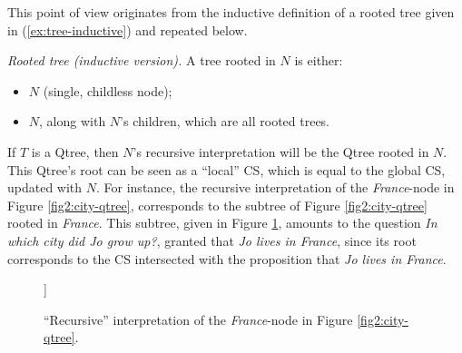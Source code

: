 This point of view originates from the inductive definition of a rooted tree given in (\ref{ex:tree-inductive}) and repeated below.

\begin{exe}
	 {\textit{Rooted tree (inductive version).} A tree rooted in $N$ is either:
		\begin{itemize}
			\item $N$ (single, childless node);
			\item $N$, along with $N$'s children, which are all rooted trees.
	\end{itemize}}
\end{exe}

If $T$ is a Qtree, then $N$'s recursive interpretation will be the Qtree rooted in $N$. This Qtree's root can be seen as a ``local'' CS, which is equal to the global CS, updated with $N$. For instance, the recursive interpretation of the \textit{France}-node in Figure \ref{fig2:city-qtree}, corresponds to the subtree of Figure \ref{fig2:city-qtree} rooted in \textit{France}. This subtree, given in Figure \ref{fig:france-subtree}, amounts to the question \textit{In which city did Jo grow up?}, granted that \textit{Jo lives in France}, since its root corresponds to the CS intersected with the proposition that \textit{Jo lives in France}.

\begin{figure}[H]
	\centering
	\begin{forest}
		[\textcolor{blue}{France}[\textcolor{orange}{{Paris}}][\textcolor{orange}{Lyon}][\textcolor{orange}{...}]]
	\end{forest}
	\caption{``Recursive'' interpretation of the \textit{France}-node in Figure \ref{fig2:city-qtree}.}\label{fig:france-subtree}
\end{figure}

